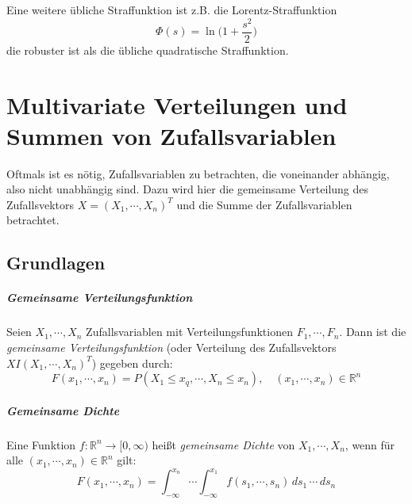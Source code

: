 \documentclass[a4paper, 11pt, accentcolor = tud3b]{tudreport}
\newcommand{\R}{\ensuremath{\mathbb{R}}}
\begin{document}
		        Eine weitere übliche Straffunktion ist z.B. die Lorentz-Straffunktion
		        \begin{equation*}
			        \Phi(s) = \ln\Big(1 + \frac{s^2}{2}\Big)
		        \end{equation*}
		        die robuster ist als die übliche quadratische Straffunktion.

    \chapter{Multivariate Verteilungen und Summen von Zufallsvariablen}
	    Oftmals ist es nötig, Zufallsvariablen zu betrachten, die voneinander abhängig, also nicht unabhängig sind. Dazu wird hier die gemeinsame Verteilung des Zufallsvektors \( X = (X_1, \cdots, X_n)^T \) und die Summe der Zufallsvariablen betrachtet.

        \section{Grundlagen}
	        \paragraph{Gemeinsame Verteilungsfunktion}
	            Seien \( X_1, \cdots, X_n \) Zufallsvariablen mit Verteilungsfunktionen \( F_1, \cdots, F_n \). Dann ist die \textit{gemeinsame Verteilungsfunktion} (oder Verteilung des Zufallsvektors \( X I (X_1, \cdots, X_n)^T \)) gegeben durch:
	            \begin{equation*}
		            F(x_1, \cdots, x_n) = P(X_1 \leq x_q, \cdots, X_n \leq x_n), \quad (x_1, \cdots, x_n) \in \R^n
	            \end{equation*}
            
            \paragraph{Gemeinsame Dichte}
	            Eine Funktion \( f : \R^n \rightarrow [0, \infty) \) heißt \textit{gemeinsame Dichte} von \( X_1, \cdots, X_n \), wenn für alle \( (x_1, \cdots, x_n) \in \R^n \) gilt:
	            \begin{equation*}
		            F(x_1, \cdots, x_n) = \int_{-\infty}^{x_n} \! \cdots \int_{-\infty}^{x_1} \! f(s_1, \cdots, s_n) \, ds_1 \, \cdots \, ds_n
	            \end{equation*}
            
\end{document}
